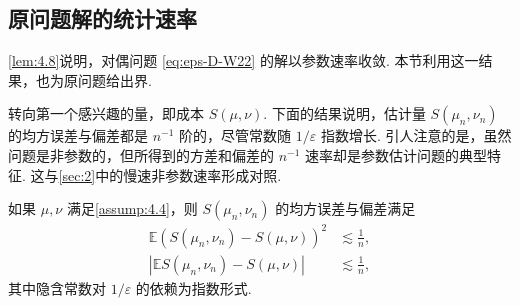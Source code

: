 \subsection{原问题解的统计速率}\label{sec:4.4}
\autoref{lem:4.8}说明，对偶问题 \eqref{eq:eps-D-W22} 的解以参数速率收敛. 本节利用这一结果，也为原问题给出界.

转向第一个感兴趣的量，即成本 $S(\mu,\nu)$. 下面的结果说明，估计量 $S(\mu_n,\nu_n)$ 的均方误差与偏差都是 $n^{-1}$ 阶的，尽管常数随 $1/\varepsilon$ 指数增长. 引人注意的是，虽然问题是非参数的，但所得到的方差和偏差的 $n^{-1}$ 速率却是参数估计问题的典型特征. 这与\autoref{sec:2}中的慢速非参数速率形成对照.
\begin{theorem}\label{thm:4.9}
如果 $\mu,\nu$ 满足\autoref{assump:4.4}，则 $S(\mu_n,\nu_n)$ 的均方误差与偏差满足
\begin{equation}\label{eq:4.22}
\begin{aligned}
\mathbb E(S(\mu_n,\nu_n)-S(\mu,\nu))^2&\lesssim\frac1n,\\
|\mathbb ES(\mu_n,\nu_n)-S(\mu,\nu)|&\lesssim\frac1n,
\end{aligned}
\end{equation}
其中隐含常数对 $1/\varepsilon$ 的依赖为指数形式.
\end{theorem}

